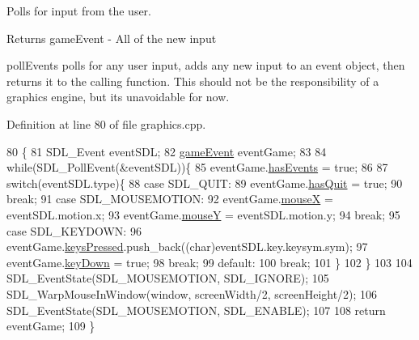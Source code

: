 Polls for input from the user. 

\begin{DoxyReturn}{Returns}
game\+Event -\/ All of the new input
\end{DoxyReturn}
poll\+Events polls for any user input, adds any new input to an event object, then returns it to the calling function. This should not be the responsibility of a graphics engine, but it\textquotesingle{}s unavoidable for now. 

Definition at line 80 of file graphics.\+cpp.


\begin{DoxyCode}
80                                     \{
81     SDL\_Event eventSDL;
82     \hyperlink{structevents_1_1game_event}{gameEvent} eventGame;
83 
84     \textcolor{keywordflow}{while}(SDL\_PollEvent(&eventSDL))\{
85         eventGame.\hyperlink{structevents_1_1game_event_a96b2729eb6d01e42431da7ac1a4d28a2}{hasEvents} = \textcolor{keyword}{true};
86 
87         \textcolor{keywordflow}{switch}(eventSDL.type)\{
88         \textcolor{keywordflow}{case} SDL\_QUIT:
89             eventGame.\hyperlink{structevents_1_1game_event_a201a773c16c73b1c8e5101274cc4de97}{hasQuit} = \textcolor{keyword}{true};
90             \textcolor{keywordflow}{break};
91         \textcolor{keywordflow}{case} SDL\_MOUSEMOTION:
92             eventGame.\hyperlink{structevents_1_1game_event_a0d128e01aa0f7a2d1dec15b3753872e2}{mouseX} = eventSDL.motion.x;
93             eventGame.\hyperlink{structevents_1_1game_event_adbeaaa754e8cd4d5895ac37162d0bd6d}{mouseY} = eventSDL.motion.y;
94             \textcolor{keywordflow}{break};
95         \textcolor{keywordflow}{case} SDL\_KEYDOWN:
96             eventGame.\hyperlink{structevents_1_1game_event_ac32c30a19cd0332094317a2f42e25b4b}{keysPressed}.push\_back((\textcolor{keywordtype}{char})eventSDL.key.keysym.sym);
97             eventGame.\hyperlink{structevents_1_1game_event_a81ecfd12bec9ce82b20462df4442c6c0}{keyDown} = \textcolor{keyword}{true};
98             \textcolor{keywordflow}{break};
99         \textcolor{keywordflow}{default}:
100             \textcolor{keywordflow}{break};
101         \}
102     \}
103 
104     SDL\_EventState(SDL\_MOUSEMOTION, SDL\_IGNORE);
105         SDL\_WarpMouseInWindow(window, screenWidth/2, screenHeight/2);
106     SDL\_EventState(SDL\_MOUSEMOTION, SDL\_ENABLE);
107 
108     \textcolor{keywordflow}{return} eventGame;
109 \}
\end{DoxyCode}
\hypertarget{classgraphics_1_1_graphics_engine_a9a8161aa35dac0cbd41bc196dbd2955c}{}
